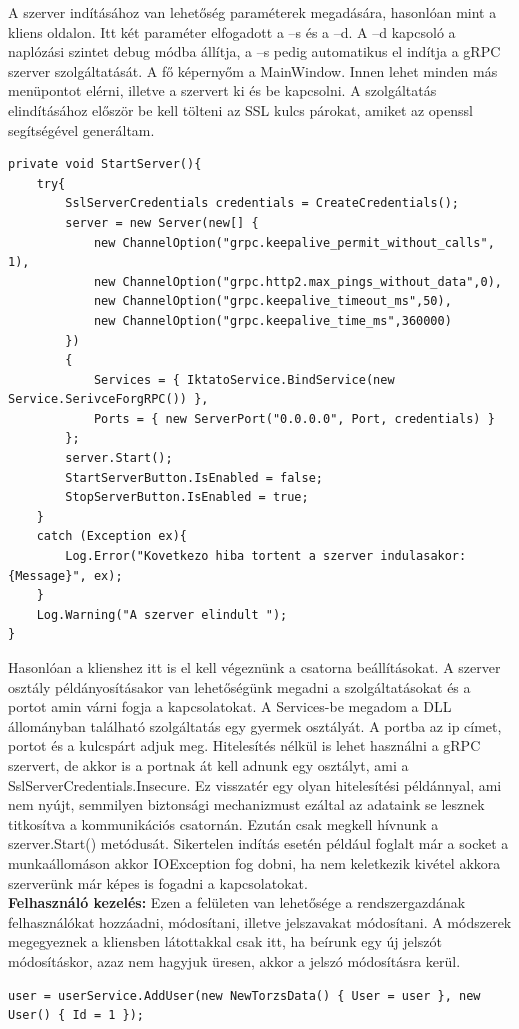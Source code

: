 \documentclass[
]{thesis-ekf}
\theoremstyle{definition}
\theoremstyle{remark}
\begin{document}
A szerver indításához van lehetőség paraméterek megadására, hasonlóan mint a kliens oldalon. Itt két paraméter elfogadott a –s és a –d. A –d kapcsoló a naplózási szintet debug módba állítja, a –s pedig automatikus el indítja a gRPC szerver szolgáltatását. A fő képernyőm a MainWindow. Innen lehet minden más menüpontot elérni, illetve a szervert ki és be kapcsolni. A szolgáltatás elindításához először be kell tölteni az SSL kulcs párokat, amiket az openssl segítségével generáltam. 
\begin{lstlisting}
private void StartServer(){
	try{
		SslServerCredentials credentials = CreateCredentials();              
		server = new Server(new[] { 
			new ChannelOption("grpc.keepalive_permit_without_calls", 1),
			new ChannelOption("grpc.http2.max_pings_without_data",0),
			new ChannelOption("grpc.keepalive_timeout_ms",50),
			new ChannelOption("grpc.keepalive_time_ms",360000)
		})
		{
			Services = { IktatoService.BindService(new Service.SerivceForgRPC()) },
			Ports = { new ServerPort("0.0.0.0", Port, credentials) }     
		};   
		server.Start();
		StartServerButton.IsEnabled = false;
		StopServerButton.IsEnabled = true;
	}
	catch (Exception ex){
		Log.Error("Kovetkezo hiba tortent a szerver indulasakor: {Message}", ex);
	}
	Log.Warning("A szerver elindult ");
}

\end{lstlisting}
Hasonlóan a klienshez itt is el kell végeznünk a csatorna beállításokat. A szerver osztály példányosításakor van lehetőségünk megadni a szolgáltatásokat és a portot amin várni fogja a kapcsolatokat. A Services-be megadom a DLL állományban található szolgáltatás egy gyermek osztályát. A portba az ip címet, portot és a kulcspárt adjuk meg. Hitelesítés nélkül is lehet használni a gRPC szervert, de akkor is a portnak át kell adnunk egy osztályt, ami a SslServerCredentials.Insecure. Ez visszatér egy olyan hitelesítési példánnyal, ami nem nyújt, semmilyen biztonsági mechanizmust ezáltal az adataink se lesznek titkosítva a kommunikációs csatornán. Ezután csak megkell hívnunk a szerver.Start() metódusát. Sikertelen indítás esetén például foglalt már a socket a munkaállomáson akkor IOException fog dobni, ha nem keletkezik kivétel akkora szerverünk már képes is fogadni a kapcsolatokat.\\
\textbf{Felhasználó kezelés: }
Ezen a felületen van lehetősége a rendszergazdának felhasználókat hozzáadni, módosítani, illetve jelszavakat módosítani. A módszerek megegyeznek a kliensben látottakkal csak itt, ha beírunk egy új jelszót módosításkor, azaz nem hagyjuk üresen, akkor a jelszó módosításra kerül.
\begin{lstlisting}
user = userService.AddUser(new NewTorzsData() { User = user }, new User() { Id = 1 });
\end{lstlisting}
 
\end{document}
